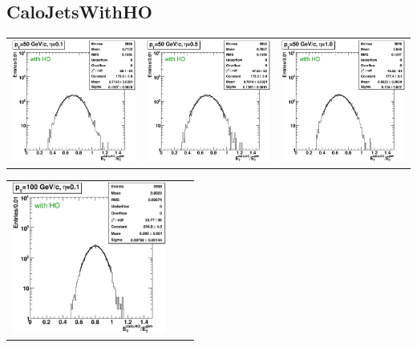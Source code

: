 \documentclass{cmspaper}
\begin{document}
\begin{appendices}
\subsection{CaloJetsWithHO}

\begin{center}
\begin{tabular}{lll}
 \includegraphics[width=2in]{figs/h_ETRatioWithHO_ET_py_fit_corr_eta0.1_pT50.eps} &
 \includegraphics[width=2in]{figs/h_ETRatioWithHO_ET_py_fit_corr_eta0.5_pT50.eps} &
 \includegraphics[width=2in]{figs/h_ETRatioWithHO_ET_py_fit_corr_eta1.0_pT50.eps} \\
\end{tabular}
\end{center}
\begin{center}
\begin{tabular}{lll}
 \includegraphics[width=2in]{figs/h_ETRatioWithHO_ET_py_fit_corr_eta0.1_pT100.eps} &

\end{tabular}
\end{center}
\end{appendices}
\end{document}
